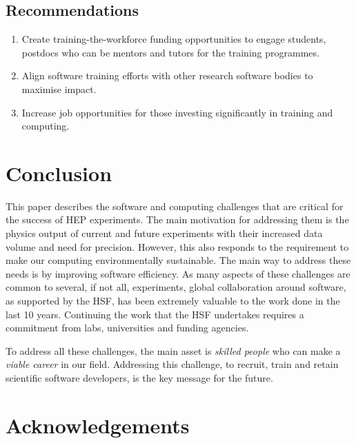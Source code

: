 \documentclass[10pt,a4paper]{article}
\begin{document}
\subsection{Recommendations}\label{recommendations-4}

\begin{enumerate}
\def\labelenumi{\arabic{enumi}.}
\item
  Create training-the-workforce funding opportunities to engage
  students, postdocs who can be mentors and tutors for the
  training programmes.
\item
  Align software training efforts with other research software bodies to
  maximise impact.
\item
  Increase job opportunities for those investing significantly in
  training and computing.
\end{enumerate}

\section{Conclusion}\label{conclusion}

This paper describes the software and computing challenges that are
critical for the success of HEP experiments. The main motivation for
addressing them is the physics output of current and future experiments
with their increased data volume and need for precision. However, this
also responds to the requirement to make our computing environmentally
sustainable. The main way to address these needs is by improving
software efficiency. As many aspects of these challenges are common to
several, if not all, experiments, global collaboration
around software, as supported by the HSF, has been extremely valuable to the
work done in the last 10 years. Continuing the work that the HSF undertakes 
requires a commitment from labs, universities and funding agencies.

To address all these challenges, the main asset is \emph{skilled people}
who can make a \emph{viable career} in our field. Addressing this
challenge, to recruit, train and retain scientific software developers,
is the key message for the future.

\section{Acknowledgements}
\end{document}
